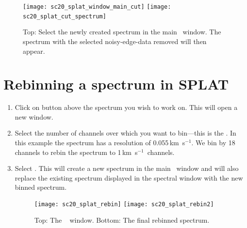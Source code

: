 \documentclass[11pt,oneside,chapters]{starlink}
\newcommand{\kms}{\mbox{$\,$km~s$^{-1}$}}   %
\newcommand{\kms}{\,km~s$^{-1}$}   %
\begin{document}
\begin{enumerate}[label=(\textbf{\arabic*})]
\begin{figure}[h!]
\begin{center}
\texttt{[image: sc20\_splat\_window\_main\_cut]}
\texttt{[image: sc20\_splat\_cut\_spectrum]}
\caption[Spectrum with noisy edges removed.]{\label{fig:splat_crop5}
  Top: Select the newly created spectrum in the main \splat\ window.
  The spectrum with the selected noisy-edge-data removed will then appear. }
\end{center}
\end{figure}

\end{enumerate}

\section{Rebinning a spectrum in SPLAT}
\label{sec:splat-rebin}


\begin{enumerate}[label=(\textbf{\arabic*})]

\item Click on  button
above the spectrum you wish to work on. This will open a new window.

\item Select the number of channels over which you want to
bin---this is the .
In this example the spectrum has a resolution of 0.055\kms. We
bin by 18 channels to rebin the spectrum to 1\kms\ channels.

\item Select . This will create a
new spectrum in the main \splat\ window and will also replace the
existing spectrum displayed in the spectral window with the new
binned spectrum.

\begin{figure}[h!]
\begin{center}
\texttt{[image: sc20\_splat\_rebin]}
\texttt{[image: sc20\_splat\_rebin2]}
\caption[Filter regions of a spectrum window.]{\label{fig:splat_rebin}
  Top: The \splat\  window.
  Bottom: The final rebinned spectrum.}
\end{center}
\end{figure}


\end{enumerate}
\end{document}
